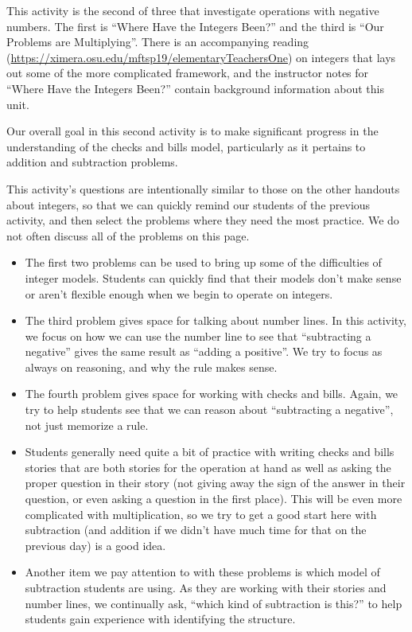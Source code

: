 \documentclass[nooutcomes]{ximera}
\begin{document}
\newpage
\begin{instructorNotes}
This activity is the second of three that investigate operations with negative numbers.  The first is ``Where Have the Integers Been?'' and the third is ``Our Problems are Multiplying''.  There is an accompanying reading (\url{https://ximera.osu.edu/mftsp19/elementaryTeachersOne}) on integers that lays out some of the more complicated framework, and the instructor notes for ``Where Have the Integers Been?'' contain background information about this unit.

Our overall goal in this second activity is to make significant progress in the understanding of the checks and bills model, particularly as it pertains to addition and subtraction problems.

This activity's questions are intentionally similar to those on the other handouts about integers, so that we can quickly remind our students of the previous activity, and then select the problems where they need the most practice.  We do not often discuss all of the problems on this page.

\begin{itemize}
    \item The first two problems can be used to bring up some of the difficulties of integer models.  Students can quickly find that their models don't make sense or aren't flexible enough when we begin to operate on integers.
    \item The third problem gives space for talking about number lines.  In this activity, we focus on how we can use the number line to see that ``subtracting a negative'' gives the same result as ``adding a positive''.  We try to focus as always on reasoning, and why the rule makes sense.
    \item The fourth problem gives space for working with checks and bills.  Again, we try to help students see that we can reason about ``subtracting a negative'', not just memorize a rule.
    \item Students generally need quite a bit of practice with writing checks and bills stories that are both stories for the operation at hand as well as asking the proper question in their story (not giving away the sign of the answer in their question, or even asking a question in the first place).  This will be even more complicated with multiplication, so we try to get a good start here with subtraction (and addition if we didn't have much time for that on the previous day) is a good idea.
    \item Another item we pay attention to with these problems is which model of subtraction students are using.  As they are working with their stories and number lines, we continually ask, ``which kind of subtraction is this?'' to help students gain experience with identifying the structure.
\end{itemize}



\end{instructorNotes}
\end{document}
